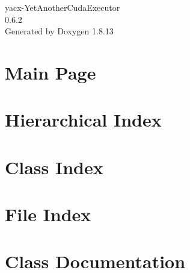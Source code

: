 \documentclass[twoside]{book}
\newcommand{\+}{\discretionary{\mbox{\scriptsize$\hookleftarrow$}}{}{}}
\newcommand{\clearemptydoublepage}{%
  \newpage{\pagestyle{empty}\cleardoublepage}%
}
\begin{document}
\hypersetup{pageanchor=false,
             bookmarksnumbered=true,
             pdfencoding=unicode
            }
\begin{titlepage}
\vspace*{7cm}
\begin{center}%
{\Large yacx-\/\+Yet\+Another\+Cuda\+Executor \\[1ex]\large 0.\+6.\+2 }\\
\vspace*{1cm}
{\large Generated by Doxygen 1.8.13}\\
\end{center}
\end{titlepage}
\clearemptydoublepage
{}
\tableofcontents
\clearemptydoublepage
{}
\hypersetup{pageanchor=true}

\chapter{Main Page}
\label{index}\hypertarget{index}{}
\chapter{Hierarchical Index}

\chapter{Class Index}

\chapter{File Index}

\chapter{Class Documentation}
































\end{document}

